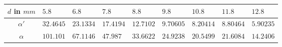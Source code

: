\begin{tabular}{c|*{8}{*{1}{l}}}
$d$ in ${\unit{mm}}$ & $5.8$ & $6.8$ & $7.8$ & $8.8$ & $9.8$ & $10.8$ & $11.8$ & $12.8$ \\ \hline
$\alpha'$ & $32.4645$ & $23.1334$ & $17.4194$ & $12.7102$ & $9.70605$ & $8.20414$ & $8.80464$ & $5.90235$ \\ \hline
$\alpha$ & $101.101$ & $67.1146$ & $47.987$ & $33.6622$ & $24.9238$ & $20.5499$ & $21.6084$ & $14.2406$\end{tabular}
